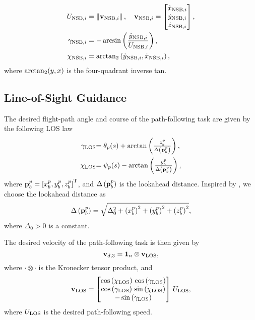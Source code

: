 \begin{subequations}
    \begin{align}
        U_{{\rm NSB}, i} &= \left\|\mathbf{v}_{{\rm NSB}, i}\right\|, \quad
        \mathbf{v}_{{\rm NSB}, i} = \begin{bmatrix} \dot{x}_{{\rm NSB}, i} \\ \dot{y}_{{\rm NSB}, i} \\ \dot{z}_{{\rm NSB}, i}\end{bmatrix}, \\*
        \gamma_{{\rm NSB}, i} &= - \arcsin\left(\frac{\dot{y}_{{\rm NSB}, i}}{U_{{\rm NSB}, i}}\right), \\
        \chi_{{\rm NSB}, i} &= \mathrm{arctan}_2 \left(\dot{y}_{{\rm NSB}, i}, \dot{x}_{{\rm NSB}, i}\right), 
    \end{align}
\end{subequations}
where ${\rm arctan}_2(y, x)$ is the four-quadrant inverse tan.

\subsection{Line-of-Sight Guidance}
\label{sec:nsb_5dof_LOS}
The desired flight-path angle and course of the path-following task are given by the following LOS law
\begin{align}
    \scale[1]{\gamma_{\rm LOS}} & \scale[1]{= \theta_p(s) + \arctan\left(\frac{z_b^p}{\Delta\left(\mat{p}_b^p\right)}\right),} \label{eq:nsb_5dof_gamma_LOS} \\
    \scale[1]{\chi_{\rm LOS}} & \scale[1]{= \psi_p(s) - \arctan\left(\frac{y_b^p}{\Delta\left(\mat{p}_b^p\right)}\right),}
\end{align}
where $\mathbf{p}_b^p = \left[x_b^p, y_b^p, z_b^p\right]^{\mathrm{T}}$, and $\Delta\left(\mathbf{p}_b^p\right)$ is the lookahead distance.
Inspired by \cite{belleter_2019_observer}, we choose the lookahead distance as
\begin{equation}
    \Delta\left(\mathbf{p}_b^p\right) = \sqrt{\Delta_0^2 + \left(x_b^p\right)^2 + \left(y_b^p\right)^2 + \left(z_b^p\right)^2}, \label{eq:nsb_5dof_delta}
\end{equation}
where $\Delta_0 > 0$ is a constant.

The desired velocity of the path-following task is then given by
\begin{equation}
    \mathbf{v}_{d, 3} = \mathbf{1}_n \otimes \mathbf{v}_{\rm LOS},
\end{equation}
where $\cdot \otimes \cdot$ is the Kronecker tensor product, and
\begin{equation}
    \mathbf{v}_{\rm LOS} = \begin{bmatrix}
        \cos\left(\chi_{\mathrm{LOS}}\right)\,\cos\left(\gamma_{\mathrm{LOS}}\right)\\ 
        \cos\left(\gamma_{\mathrm{LOS}}\right)\,\sin\left(\chi_{\mathrm{LOS}}\right)\\ 
        -\sin\left(\gamma_{\mathrm{LOS}}\right)
    \end{bmatrix} \, U_{\rm LOS},
\end{equation}
where $U_{\rm LOS}$ is the desired path-following speed.

